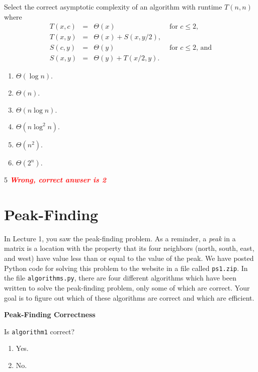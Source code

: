 \documentclass[12pt,twoside]{article}
\begin{document}
\begin{problems}
\begin{problemparts}
\problempart {}
Select the correct asymptotic complexity
of an algorithm with runtime $T(n, n)$
where 
$$
\begin{array}{rcll}
T(x, c) &=& \Theta(x) & \textrm{ for $c \le 2$}, \\
T(x, y) &=& \Theta(x) + S(x, y / 2), \\
S(c, y) &=& \Theta(y) & \textrm{ for $c \le 2$, and} \\
S(x, y) &=& \Theta(y) + T(x / 2, y).
\end{array}
$$

\begin{enumerate}
\item $\Theta(\log n)$.
\item $\Theta(n)$.
\item $\Theta(n \log n)$.
\item $\Theta(n \log^2 n)$.
\item $\Theta(n^2)$.
\item $\Theta(2^n)$.
\end{enumerate}

\ifsolution \solution{}
5  \textcolor{red}{\textit{ \textbf{  Wrong, correct anwser is  2 }}}
\fi

\end{problemparts}

\section*{Peak-Finding}

In Lecture 1,
you saw the peak-finding problem.
As a reminder,
a \emph{peak} in a matrix
is a location with the property that its four neighbors
(north, south, east, and west)
have value less than or equal to the value of the peak.
We have posted Python code for solving this problem
to the website in a file called \texttt{ps1.zip}.
In the file \texttt{algorithms.py},
there are four different algorithms
which have been written
to solve the peak-finding problem,
only some of which are correct.
Your goal is to figure out
which of these algorithms are correct
and which are efficient.

\problem {} \textbf{Peak-Finding Correctness}

\begin{problemparts}

\problempart {} Is \texttt{algorithm1} correct?
\begin{enumerate}
\item Yes.
\item No.
\end{enumerate}


\end{problemparts}
\end{problems}
\end{document}
